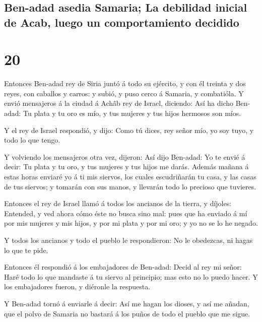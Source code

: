 \hypertarget{ben-adad-asedia-samaria-la-debilidad-inicial-de-acab-luego-un-comportamiento-decidido}{%
\subsection{Ben-adad asedia Samaria; La debilidad inicial de Acab, luego
un comportamiento
decidido}\label{ben-adad-asedia-samaria-la-debilidad-inicial-de-acab-luego-un-comportamiento-decidido}}

\hypertarget{section-11-20}{%
\section{20}\label{section-11-20}}

 Entonces Ben-adad rey de Siria juntó á todo su ejército,
y con él treinta y dos reyes, con caballos y carros: y subió, y puso
cerco á Samaria, y combatióla.  Y envió mensajeros á la
ciudad á Achâb rey de Israel, diciendo:  Así ha dicho
Ben-adad: Tu plata y tu oro es mío, y tus mujeres y tus hijos hermosos
son míos.

 Y el rey de Israel respondió, y dijo: Como tú dices, rey
señor mío, yo soy tuyo, y todo lo que tengo.

 Y volviendo los mensajeros otra vez, dijeron: Así dijo
Ben-adad: Yo te envié á decir: Tu plata y tu oro, y tus mujeres y tus
hijos me darás.  Además mañana á estas horas enviaré yo á
ti mis siervos, los cuales escudriñarán tu casa, y las casas de tus
siervos; y tomarán con sus manos, y llevarán todo lo precioso que
tuvieres.

 Entonces el rey de Israel llamó á todos los ancianos de
la tierra, y díjoles: Entended, y ved ahora cómo éste no busca sino mal:
pues que ha enviado á mí por mis mujeres y mis hijos, y por mi plata y
por mi oro; y yo no se lo he negado.

 Y todos los ancianos y todo el pueblo le respondieron: No
le obedezcas, ni hagas lo que te pide.

 Entonces él respondió á los embajadores de Ben-adad:
Decid al rey mi señor: Haré todo lo que mandaste á tu siervo al
principio; mas esto no lo puedo hacer. Y los embajadores fueron, y
diéronle la respuesta.

 Y Ben-adad tornó á enviarle á decir: Así me hagan los
dioses, y así me añadan, que el polvo de Samaria no bastará á los puños
de todo el pueblo que me sigue.

